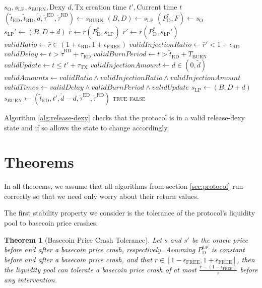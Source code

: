 \documentclass{ifcolog}
\newcommand{\Pdt}{P_{\mathrm{D}}^{*}}
\newcommand{\Plp}{P_{\mathrm{D}}^{\mathrm{LP}}}
\newcommand{\rr}{\bar{r}}
\newcommand{\slp}{s_{\mathrm{LP}}}
\newcommand{\soracle}{s_{\textrm{O}}}
\newcommand{\sburn}{s_{\textrm{BURN}}}
\newcommand{\tautx}{\tau_{\textrm{TX}}}
\newcommand{\epsilonfree}{\epsilon_{\textrm{FREE}}}
\newcommand{\epsilonreleasedexy}{\epsilon_{\textrm{RD}}}
\newtheorem{theorem}{Theorem}
\begin{document}
\begin{algorithm}[H]
\caption{ReleaseDexy}\label{alg:release-dexy}
\begin{algorithmic}[1]
  \Require $\soracle, \slp, \sburn, \textrm{Dexy } d, \textrm{Tx creation time } t', \textrm{Current time } t$
  \State $(\tilde{t}_{\textrm{ED}}, \tilde{t}_{\textrm{RD}}, \tilde{d}, \tilde{\tau}^{\textrm{ED}}, \tilde{\tau}^{\textrm{RD}}) \gets \sburn$
  \State $(B, D) \gets \slp$
  \State $(\Pdt, F) \gets \soracle$
  \State $\slp' \gets (B, D + d)$ 
  \State $\rr \gets \rr(\Pdt, \slp) $
  \State $\rr' \gets \rr(\Pdt, \slp')$
  \State $validRatio \gets \rr \in \left(1 + \epsilonreleasedexy , 1 + \epsilonfree\right)$
  \State $validInjectionRatio \gets \rr' <  1 + \epsilonreleasedexy$
  \State $validDelay \gets t > \tilde{\tau}^{\textrm{RD}} + \tau_{\textrm{RD}}$
  \State $validBurnPeriod \gets t > \tilde{t}_{\textrm{RD}} + T_{\textrm{BURN}}$
  \State $validUpdate \gets t \le t' + \tautx$
  \State $validInjectionAmount \gets d \in (0, \tilde{d})$
  \State $validAmounts \gets validRatio \land validInjectionRatio \land validInjectionAmount$
  \State $validTimes \gets validDelay \land validBurnPeriod \land validUpdate$
    \State $\slp \gets (B, D+d)$
    \State $\sburn \gets (\tilde{t}_{\textrm{ED}}, t', \tilde{d}-d, \tilde{\tau}^{\textrm{ED}}, \tilde{\tau}^{\textrm{RD}})$
    \State \Return \textsc{true}
  \Else
    \State \Return \textsc{false}
  \EndIf
\end{algorithmic}
\end{algorithm}

Algorithm \ref{alg:release-dexy} checks that the protocol is in a valid release-dexy state and if so allows the state to change accordingly.

\newpage

\section{Theorems}
\label{sec:theorems}

In all theorems, we assume that all algorithms from section \ref{sec:protocol} run correctly so that we need only worry about their 
return values.

The first stability property we consider is the tolerance of the protocol's liquidity pool
to basecoin price crashes.

\begin{theorem}[Basecoin Price Crash Tolerance]
  Let $s$ and $s'$ be the oracle price before and after a basecoin price crash, respectively. 
  Assuming $\Plp$ is constant before and after a basecoin price crash, and 
  that $\rr \in \left[1-\epsilonfree, 1+\epsilonfree \right]$, then the liquidity pool can 
  tolerate a basecoin price crash of at most  $\frac{\rr - (1-\epsilonfree)}{\rr}$ 
  before any intervention.
\end{theorem}
\end{document}
